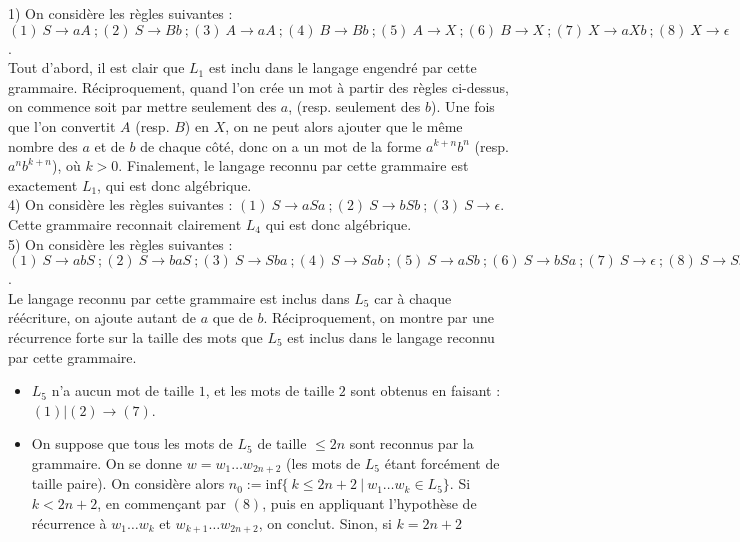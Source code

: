\documentclass[11pt,a4paper]{article}
\begin{document}
1) On considère les règles suivantes : $(1) \ S \to aA  \ ; (2)  \ S \to Bb \ ; (3) \ A \to aA \ ; (4) \ B \to Bb \ ; (5) \ A \to X \ ; (6) \ B \to X \ ; (7) \ X \to aXb \ ; (8) \ X \to \epsilon$. \\ 
Tout d'abord, il est clair que $L_1$ est inclu dans le langage engendré par cette grammaire. Réciproquement, quand l'on crée un mot à partir des règles ci-dessus, on commence soit par mettre seulement des $a$, (resp. seulement des $b$). Une fois que l'on convertit $A$ (resp. $B$) en $X$, on ne peut alors ajouter que le même nombre des $a$ et de $b$ de chaque côté, donc on a un mot de la forme $a^{k+n}b^n$ (resp. $a^nb^{k+n}$), où $k>0$. Finalement, le langage reconnu par cette grammaire est exactement $L_1$, qui est donc algébrique.
\\

4) On considère les règles suivantes : $ (1) \ S \to aSa \ ; (2) \ S \to bSb \ ; (3) \ S \to \epsilon$. \\ 
Cette grammaire reconnait clairement $L_4$ qui est donc algébrique.
\\

5) On considère les règles suivantes : $(1) \ S \to abS \ ; (2) \ S \to baS \ ; (3) \ S \to Sba \ ; (4) \ S \to Sab \ ; (5) \ S \to aSb \ ; (6) \ S \to bSa \ ; (7) \ S \to \epsilon \ ; (8) \ S \to SS $. \\
Le langage reconnu par cette grammaire est inclus dans $L_5$ car à chaque réécriture, on ajoute autant de $a$ que de $b$. Réciproquement, on montre par une récurrence forte sur la taille des mots que $L_5$ est inclus dans le langage reconnu par cette grammaire.
\begin{itemize}
\item $L_5$ n'a aucun mot de taille $1$, et les mots de taille $2$ sont obtenus en faisant : $(1) | (2) \to (7)$.
\item On suppose que tous les mots de $L_5$ de taille $ \leq 2n$ sont reconnus par la grammaire. On se donne $w=w_1\dots w_{2n+2}$ (les mots de $L_5$ étant forcément de taille paire). On considère alors $n_0 := \text{inf}\{\  k \leq 2n+2 \ | \ w_1\dots w_k \in L_5 \}$. Si $k<2n+2$, en commençant par $(8)$, puis en appliquant l'hypothèse de récurrence à $w_1\dots w_k$ et $w_{k+1}\dots w_{2n+2}$, on conclut. Sinon, si $k=2n+2$ 
\end{itemize}
\end{document}
